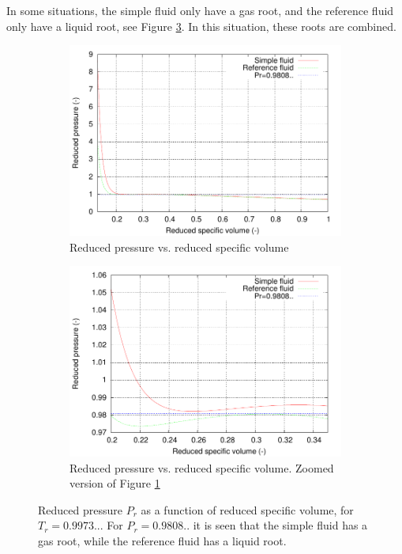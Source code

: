 \documentclass[english]{../thermomemo/thermomemo}
\numberwithin{equation}{section}
\begin{document}
In some situations, the simple fluid only have a gas root, and the
reference fluid only have a liquid root, see Figure \ref{fig:roots}. In
this situation, these roots are combined. 
\begin{figure}[h]
  \begin{subfigure}[b]{0.45\linewidth}
    \centering
    \includegraphics[width=1.0\textwidth]{roots}
    \caption{Reduced pressure vs. reduced specific volume}
    \label{fig:roots_a}
  \end{subfigure}
  \hfill
  \begin{subfigure}[b]{0.45\linewidth}
    \centering
    \includegraphics[width=1.0\textwidth]{roots_zoom}
    \caption{Reduced pressure vs. reduced specific volume. Zoomed
      version of Figure \ref{fig:roots_a}}
    \label{fig:roots_b}
  \end{subfigure}
  \caption{Reduced pressure $P_r$ as a function of reduced specific
    volume, for $T_r = 0.9973..$. For $P_r = 0.9808..$ it is seen that the
    simple fluid has a gas root, while the reference fluid has a liquid root.}
  \label{fig:roots}
\end{figure}
\end{document}

